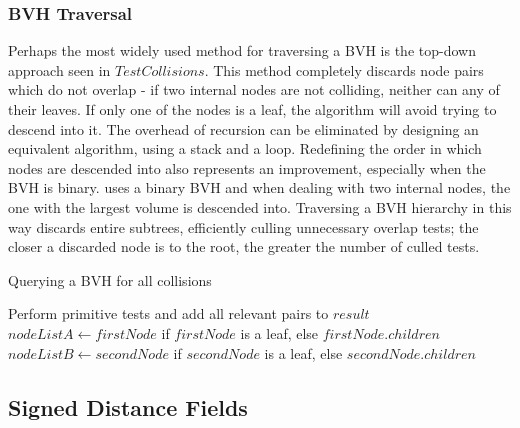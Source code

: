 \subsubsection{BVH Traversal}
\label{sub-sub-sec:traversal}

Perhaps the most widely used method for traversing a BVH is the top-down approach seen in \hyperref[alg:BVHQuery]{$TestCollisions$}. This method completely discards node pairs which do not overlap - if two internal nodes are not colliding, neither can any of their leaves. If only one of the nodes is a leaf, the algorithm will avoid trying to descend into it. The overhead of recursion can be eliminated by designing an equivalent algorithm, using a stack and a loop. Redefining the order in which nodes are descended into also represents an improvement, especially when the BVH is binary. \citep{vdb97} uses a binary BVH and when dealing with two internal nodes, the one with the largest volume is descended into. Traversing a BVH hierarchy in this way discards entire subtrees, efficiently culling unnecessary overlap tests; the closer a discarded node is to the root, the greater the number of culled tests.

\begin{algorithm}
	\label{alg:BVHQuery}
	\caption{Querying a BVH for all collisions}
	\begin{algorithmic}[1]
		\State Perform primitive tests and add all relevant pairs to $result$		
		\Else
		\State $nodeListA \gets firstNode$ if $firstNode$ is a leaf, else $firstNode.children$
		\State $nodeListB \gets secondNode$ if $secondNode$ is a leaf, else $secondNode.children$
		\State {}
		\EndFor
		\EndIf
		\EndIf
		\EndProcedure
	\end{algorithmic}
\end{algorithm}

\FloatBarrier
\subsection{Signed Distance Fields}
\label{sub-sec:sdf}


